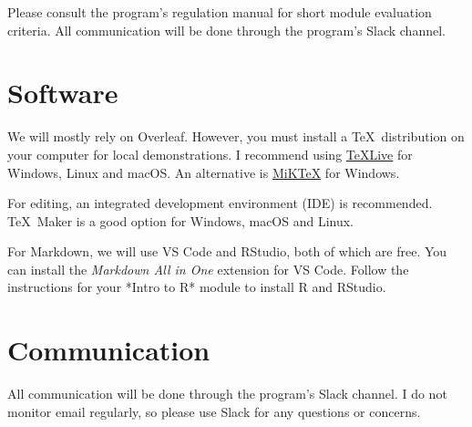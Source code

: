 \documentclass[a4paper,11pt]{article}
\begin{document}
Please consult the program's regulation manual for short module evaluation criteria. All communication will be done through the program's Slack channel. 

\section{Software}

We will mostly rely on Overleaf. However, you must install a \TeX \ distribution on your computer for local demonstrations. I recommend using \href{https://www.tug.org/texlive/}{\TeX Live} for Windows, Linux and macOS. An alternative is \href{https://miktex.org/}{MiK\TeX} for Windows.

For editing, an integrated development environment (IDE) is recommended. \TeX \ Maker is a good option for Windows, macOS and Linux.

For Markdown, we will use VS Code and RStudio, both of which are free. You can install the \textit{Markdown All in One} extension for VS Code. Follow the instructions for your *Intro to R* module to install R and RStudio.

\section{Communication}

All communication will be done through the program's Slack channel. I do not monitor email regularly, so please use Slack for any questions or concerns.

\renewcommand\bibname{Reference Material}
\printbibliography
\end{document}
